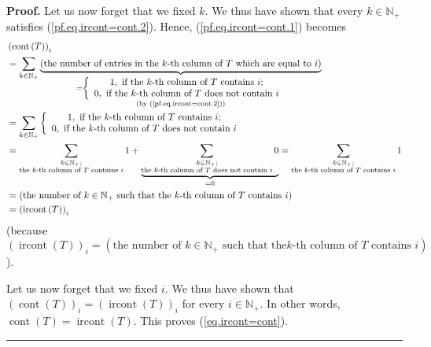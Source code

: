 \documentclass[numbers=enddot,12pt,final,onecolumn,notitlepage]{scrartcl}%
\theoremstyle{definition}
\newenvironment{proof}[1][Proof]{\noindent\textbf{#1.} }{\ \rule{0.5em}{0.5em}}
\newenvironment{verlong}{}{}
\let\sumnonlimits\sum
\renewcommand{\sum}{\sumnonlimits\limits}
\begin{document}
\begin{verlong}
\begin{proof}
Let us now forget that we fixed $k$. We thus have shown that every
$k\in\mathbb{N}_{+}$ satisfies (\ref{pf.eq.ircont=cont.2}). Hence,
(\ref{pf.eq.ircont=cont.1}) becomes%
\begin{align*}
&  \left(  \operatorname*{cont}\left(  T\right)  \right)  _{i}\\
&  =\sum_{k\in\mathbb{N}_{+}}\underbrace{\left(  \text{the number of entries
in the }k\text{-th column of }T\text{ which are equal to }i\right)
}_{\substack{=\left\{
\begin{array}
[c]{c}%
1,\ \text{if the }k\text{-th column of }T\text{ contains }i;\\
0,\ \text{if the }k\text{-th column of }T\text{ does not contain }i
\end{array}
\right.  \\\text{(by (\ref{pf.eq.ircont=cont.2}))}}}\\
&  =\sum_{k\in\mathbb{N}_{+}}\left\{
\begin{array}
[c]{c}%
1,\ \text{if the }k\text{-th column of }T\text{ contains }i;\\
0,\ \text{if the }k\text{-th column of }T\text{ does not contain }i
\end{array}
\right. \\
&  =\sum_{\substack{k\in\mathbb{N}_{+};\\\text{the }k\text{-th column of
}T\text{ contains }i}}1+\underbrace{\sum_{\substack{k\in\mathbb{N}%
_{+};\\\text{the }k\text{-th column of }T\text{ does not contain }i}}0}%
_{=0}=\sum_{\substack{k\in\mathbb{N}_{+};\\\text{the }k\text{-th column of
}T\text{ contains }i}}1\\
&  =\left(  \text{the number of }k\in\mathbb{N}_{+}\text{ such that the
}k\text{-th column of }T\text{ contains }i\right) \\
&  =\left(  \operatorname*{ircont}\left(  T\right)  \right)  _{i}%
\end{align*}
(because $\left(  \operatorname*{ircont}\left(  T\right)  \right)
_{i}=\left(  \text{the number of }k\in\mathbb{N}_{+}\text{ such that the
}k\text{-th column of }T\text{ contains }i\right)  $).

Let us now forget that we fixed $i$. We thus have shown that $\left(
\operatorname*{cont}\left(  T\right)  \right)  _{i}=\left(
\operatorname*{ircont}\left(  T\right)  \right)  _{i}$ for every
$i\in\mathbb{N}_{+}$. In other words, $\operatorname*{cont}\left(  T\right)
=\operatorname*{ircont}\left(  T\right)  $. This proves (\ref{eq.ircont=cont}).
\end{proof}
\end{verlong}
\end{document}
